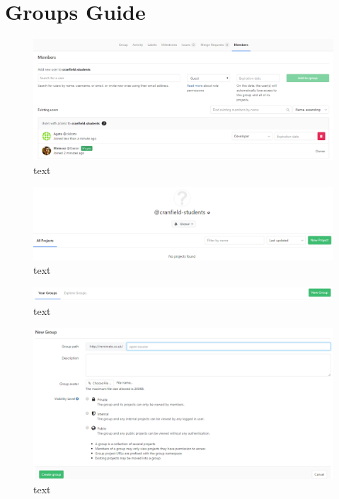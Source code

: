 \section{Groups Guide} \label{s:platform-user-guide:groups} 
	\begin{figure}[!htbp]
		\centering
		\includegraphics[width=1\textwidth]{img/ug-groups/group-members}
		\caption{text}
		\label{key}
	\end{figure}

	\begin{figure}[!htbp]
		\centering
		\includegraphics[width=1\textwidth]{img/ug-groups/group-projects}
		\caption{text}
		\label{key}
	\end{figure}

	\begin{figure}[!htbp]
		\centering
		\includegraphics[width=1\textwidth]{img/ug-groups/new-group1}
		\caption{text}
		\label{key}
	\end{figure}

	\begin{figure}[!htbp]
		\centering
		\includegraphics[width=1\textwidth]{img/ug-groups/new-group-settings}
		\caption{text}
		\label{key}
	\end{figure}